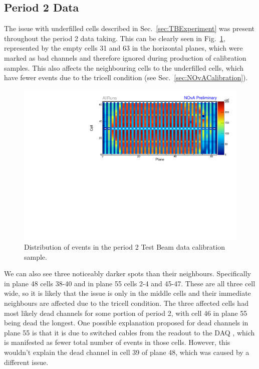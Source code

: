 \FloatBarrier
\subsection{Period 2 Data}
The issue with underfilled cells described in Sec.~\ref{sec:TBExperiment} was present throughout the period 2 data taking. This can be clearly seen in Fig.~\ref{fig:Calibhist_period2}, represented by the empty cells 31 and 63 in the horizontal planes, which were marked as bad channels and therefore ignored during production of calibration samples. This also affects the neighbouring cells to the underfilled cells, which have fewer events due to the tricell condition (see Sec.~\ref{sec:NOvACalibration}).

\begin{figure}[h]
\centering
\includegraphics[width=\textwidth]{Plots/TBCalibration/Attenprofs_P2Data_CellPlane_AllRuns.pdf}
\caption[Plane-Cell distribution of hits for the period 2 data sample]{Distribution of events in the period 2 Test Beam data calibration sample.}
\label{fig:Calibhist_period2}
\end{figure}

We can also see three noticeably darker spots than their neighbours. Specifically in plane 48 cells 38-40 and in plane 55 cells 2-4 and 45-47. These are all three cell wide, so it is likely that the issue is only in the middle cells and their immediate neighbours are affected due to the tricell condition. The three affected cells had most likely dead channels for some portion of period 2, with cell 46 in plane 55 being dead the longest. One possible explanation proposed for dead channels in plane 55 is that it is due to switched cables from the readout to the \gls{DAQ} \cite{NOvA-doc-49674}, which is manifested as fewer total number of events in those cells. However, this wouldn't explain the dead channel in cell 39 of plane 48, which was caused by a different issue.

